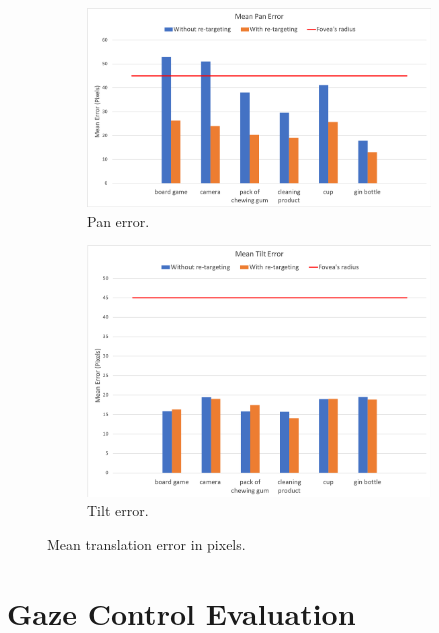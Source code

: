 \documentclass{l4proj}
\begin{document}
\begin{figure}[H]
  \centering
  \begin{subfigure}[b]{0.8\textwidth}
    \includegraphics[width=\textwidth]{l4template-master/mean_pan_error.png}
    \caption{Pan error.}
    \label{panerror}
  \end{subfigure}
  
  \begin{subfigure}[b]{0.8\textwidth}
    \includegraphics[width=\textwidth]{l4template-master/mean_tilt_error.png}
    \caption{Tilt error.}
    \label{tilterror}
  \end{subfigure}
  
  


\caption{Mean translation error in pixels.}
\label{meanerror}
\end{figure}

\section{Gaze Control Evaluation}
\end{document}
